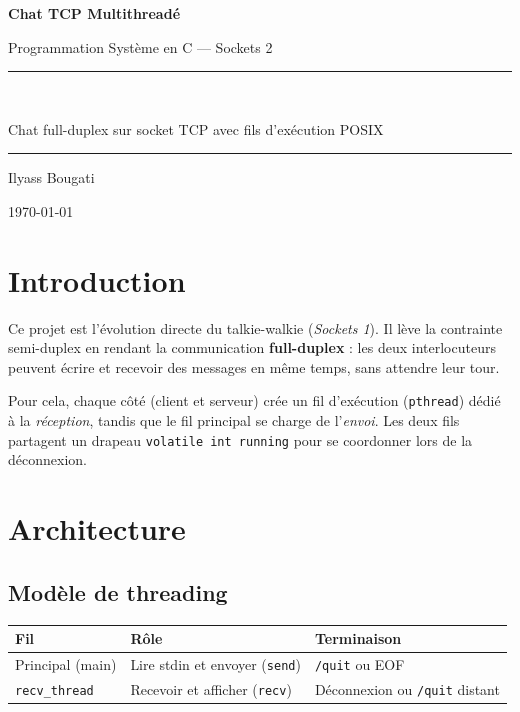 \documentclass[12pt,a4paper]{article}
\begin{document}
\begin{titlepage}
    \centering
    \vspace*{2cm}
    {\Huge\bfseries Chat TCP Multithreadé\par}
    \vspace{0.5cm}
    {\Large Programmation Système en C --- Sockets 2\par}
    \vspace{2cm}
    \rule{\linewidth}{0.4pt}\\[0.4cm]
    {\large Chat full-duplex sur socket TCP avec fils d'exécution POSIX\par}
    \rule{\linewidth}{0.4pt}
    \vfill
    {\large Ilyass Bougati\par}
    \vspace{0.3cm}
    {\large \today\par}
\end{titlepage}

\tableofcontents
\newpage

\section{Introduction}

Ce projet est l'évolution directe du talkie-walkie (\emph{Sockets 1}). Il
lève la contrainte semi-duplex en rendant la communication \textbf{full-duplex}
: les deux interlocuteurs peuvent écrire et recevoir des messages en même temps,
sans attendre leur tour.

Pour cela, chaque côté (client et serveur) crée un fil d'exécution
(\texttt{pthread}) dédié à la \emph{réception}, tandis que le fil principal
se charge de l'\emph{envoi}. Les deux fils partagent un drapeau
\texttt{volatile int running} pour se coordonner lors de la déconnexion.

\section{Architecture}

\subsection{Modèle de threading}

\begin{center}
\begin{tabular}{@{}lll@{}}
\toprule
Fil & Rôle & Terminaison \\
\midrule
Principal (main) & Lire stdin et envoyer (\texttt{send}) & \texttt{/quit} ou EOF \\
\texttt{recv\_thread} & Recevoir et afficher (\texttt{recv}) & Déconnexion ou \texttt{/quit} distant \\
\bottomrule
\end{tabular}
\end{center}
\end{document}
